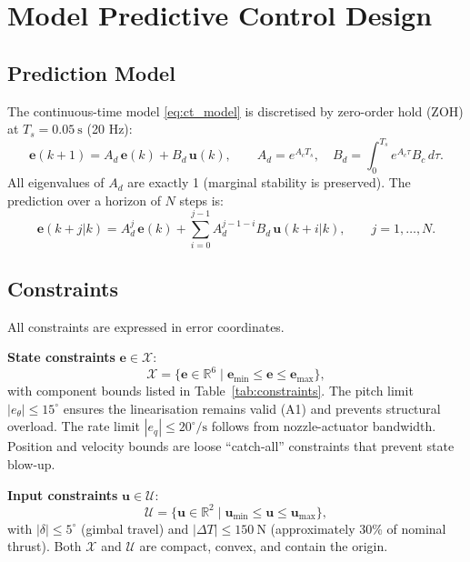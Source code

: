 \documentclass[11pt,a4paper]{article}
\newcommand{\vect}[1]{\bm{#1}}
\newcommand{\R}{\mathbb{R}}
\newcommand{\eset}{\mathcal{X}}
\newcommand{\uset}{\mathcal{U}}
\begin{document}
\section{Model Predictive Control Design}

\subsection{Prediction Model}

The continuous-time model \eqref{eq:ct_model} is discretised by zero-order hold
(ZOH) at $T_s = 0.05\ \mathrm{s}$ (20 Hz):
\begin{equation}
  \vect{e}(k+1) = A_d\,\vect{e}(k) + B_d\,\vect{u}(k), \qquad
  A_d = e^{A_c T_s}, \quad B_d = \int_0^{T_s} e^{A_c\tau}B_c\,d\tau.
  \label{eq:dt_model}
\end{equation}
All eigenvalues of $A_d$ are exactly 1 (marginal stability is preserved).
The prediction over a horizon of $N$ steps is:
\begin{equation}
  \vect{e}(k+j|k) = A_d^j\,\vect{e}(k) + \sum_{i=0}^{j-1} A_d^{j-1-i}B_d\,\vect{u}(k+i|k),
  \qquad j=1,\ldots,N.
\end{equation}

\subsection{Constraints}

All constraints are expressed in error coordinates.

\textbf{State constraints} $\vect{e} \in \eset$:
\begin{equation}
  \eset = \bigl\{\vect{e}\in\R^6 \;\big|\; \vect{e}_{\min} \leq \vect{e} \leq \vect{e}_{\max}\bigr\},
\end{equation}
with component bounds listed in Table~\ref{tab:constraints}.
The pitch limit $|e_\theta| \leq 15^{\circ}$ ensures the linearisation remains valid (A1)
and prevents structural overload.  The rate limit $|e_q| \leq 20^{\circ}/\mathrm{s}$
follows from nozzle-actuator bandwidth.  Position and velocity bounds are loose
``catch-all'' constraints that prevent state blow-up.

\textbf{Input constraints} $\vect{u} \in \uset$:
\begin{equation}
  \uset = \bigl\{\vect{u}\in\R^2 \;\big|\; \vect{u}_{\min} \leq \vect{u} \leq \vect{u}_{\max}\bigr\},
\end{equation}
with $|\delta| \leq 5^{\circ}$ (gimbal travel) and $|\Delta T| \leq 150\ \mathrm{N}$
(approximately 30\% of nominal thrust).  Both $\eset$ and $\uset$ are compact,
convex, and contain the origin.
\end{document}
